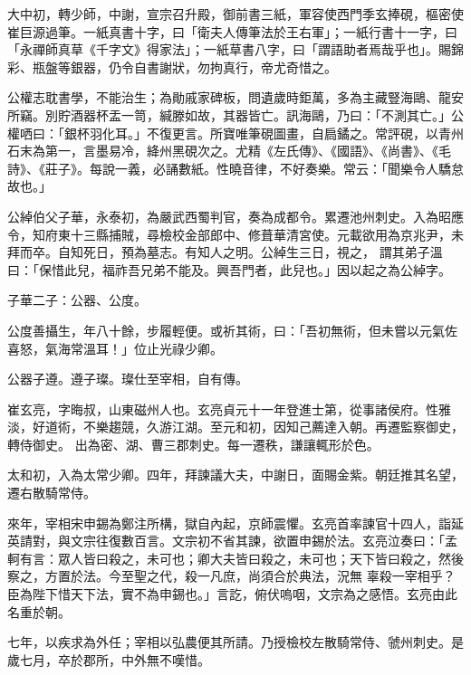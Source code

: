 \begin{pinyinscope}
 大中初，轉少師，中謝，宣宗召升殿，御前書三紙，軍容使西門季玄捧硯，樞密使崔巨源過筆。一紙真書十字，曰「衛夫人傳筆法於王右軍」；一紙行書十一字，曰「永禪師真草《千字文》得家法」；一紙草書八字，曰「謂語助者焉哉乎也」。賜錦彩、瓶盤等銀器，仍令自書謝狀，勿拘真行，帝尤奇惜之。



 公權志耽書學，不能治生；為勛戚家碑板，問遺歲時鉅萬，多為主藏豎海鷗、龍安所竊。別貯酒器杯盂一笥，緘滕如故，其器皆亡。訊海鷗，乃曰：「不測其亡。」公
 權哂曰：「銀杯羽化耳。」不復更言。所寶唯筆硯圖畫，自扃鐍之。常評硯，以青州石末為第一，言墨易冷，絳州黑硯次之。尤精《左氏傳》、《國語》、《尚書》、《毛詩》、《莊子》。每說一義，必誦數紙。性曉音律，不好奏樂。常云：「聞樂令人驕怠故也。」



 公綽伯父子華，永泰初，為嚴武西蜀判官，奏為成都令。累遷池州刺史。入為昭應令，知府東十三縣捕賊，尋檢校金部郎中、修葺華清宮使。元載欲用為京兆尹，未拜而卒。自知死日，預為墓志。有知人之明。公綽生三日，視之，
 謂其弟子溫曰：「保惜此兒，福祚吾兄弟不能及。興吾門者，此兒也。」因以起之為公綽字。



 子華二子：公器、公度。



 公度善攝生，年八十餘，步履輕便。或祈其術，曰：「吾初無術，但未嘗以元氣佐喜怒，氣海常溫耳！」位止光祿少卿。



 公器子遵。遵子璨。璨仕至宰相，自有傳。



 崔玄亮，字晦叔，山東磁州人也。玄亮貞元十一年登進士第，從事諸侯府。性雅淡，好道術，不樂趨競，久游江湖。至元和初，因知己薦達入朝。再遷監察御史，轉侍御史。
 出為密、湖、曹三郡刺史。每一遷秩，謙讓輒形於色。



 太和初，入為太常少卿。四年，拜諫議大夫，中謝日，面賜金紫。朝廷推其名望，遷右散騎常侍。



 來年，宰相宋申錫為鄭注所構，獄自內起，京師震懼。玄亮首率諫官十四人，詣延英請對，與文宗往復數百言。文宗初不省其諫，欲置申錫於法。玄亮泣奏曰：「孟軻有言：眾人皆曰殺之，未可也；卿大夫皆曰殺之，未可也；天下皆曰殺之，然後察之，方置於法。今至聖之代，殺一凡庶，尚須合於典法，況無
 辜殺一宰相乎？臣為陛下惜天下法，實不為申錫也。」言訖，俯伏嗚咽，文宗為之感悟。玄亮由此名重於朝。



 七年，以疾求為外任；宰相以弘農便其所請。乃授檢校左散騎常侍、虢州刺史。是歲七月，卒於郡所，中外無不嘆惜。




\end{pinyinscope}
